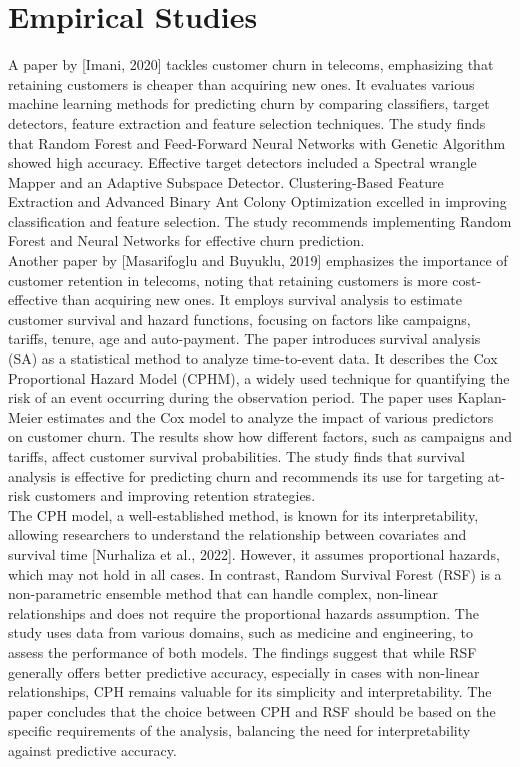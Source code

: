 \documentclass[doublespacing,12pt]{report}
\begin{document}
\section{Empirical Studies}
A paper by [Imani, 2020] tackles customer churn in telecoms, emphasizing that retaining customers is cheaper than acquiring new ones. It evaluates various machine learning methods for predicting churn by comparing classifiers, target detectors, feature extraction and feature selection techniques. The study finds that Random Forest and Feed-Forward Neural Networks with Genetic Algorithm showed high accuracy. Effective target detectors included a Spectral wrangle Mapper and an Adaptive Subspace Detector. Clustering-Based Feature Extraction and Advanced Binary Ant Colony Optimization excelled in improving classification and feature selection. The study recommends implementing Random Forest and Neural Networks for effective churn prediction.\\
Another paper by [Masarifoglu and Buyuklu, 2019] emphasizes the importance of customer retention in telecoms, noting that retaining customers is more cost-effective than acquiring new ones. It employs survival analysis to estimate customer survival and hazard functions, focusing on factors like campaigns, tariffs, tenure, age and auto-payment. The paper introduces survival analysis (SA) as a statistical method to analyze time-to-event data. It describes the Cox Proportional Hazard Model (CPHM), a widely used technique for quantifying the risk of an event occurring during the observation period. The paper uses Kaplan-Meier estimates and the Cox model to analyze the impact of various predictors on customer churn. The results show how different factors, such as campaigns and tariffs, affect customer survival probabilities. The study finds that survival analysis is effective for predicting churn and recommends its use for targeting at-risk customers and improving retention strategies.\\
The CPH model, a well-established method, is known for its interpretability, allowing researchers to understand the relationship between covariates and survival time [Nurhaliza et al., 2022]. However, it assumes proportional hazards, which may not hold in all cases. In contrast, Random Survival Forest (RSF) is a non-parametric ensemble method that can handle complex, non-linear relationships and does not require the proportional hazards assumption. The study uses data from various domains, such as medicine and engineering, to assess the performance of both models. The findings suggest that while RSF generally offers better predictive accuracy, especially in cases with non-linear relationships, CPH remains valuable for its simplicity and interpretability. The paper concludes that the choice between CPH and RSF should be based on the specific requirements of the analysis, balancing the need for interpretability against predictive accuracy.
\end{document}
